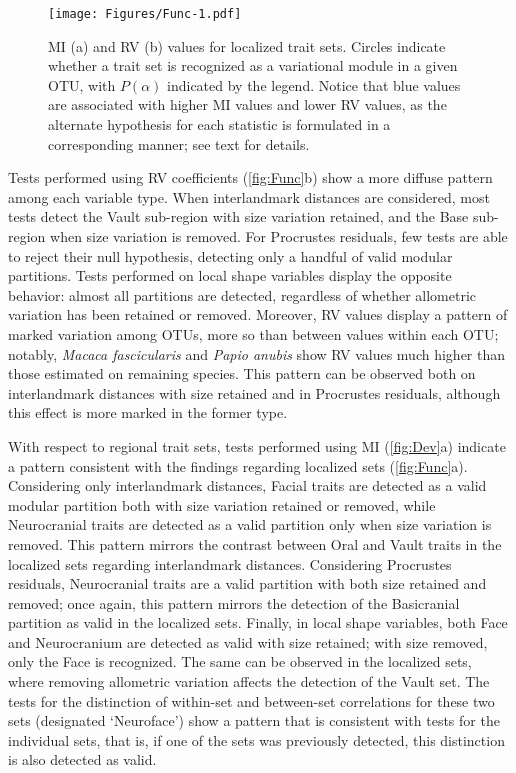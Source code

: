 \documentclass[12pt,]{article}
\begin{document}
\begin{figure}[htbp]
\centering
\texttt{[image: Figures/Func-1.pdf]}
\caption{MI (a) and RV (b) values for localized trait sets. Circles
indicate whether a trait set is recognized as a variational module in a
given OTU, with $P(\alpha)$ indicated by the legend. Notice that blue
values are associated with higher MI values and lower RV values, as the
alternate hypothesis for each statistic is formulated in a corresponding
manner; see text for details. \label{fig:Func}}
\end{figure}

Tests performed using RV coefficients (\autoref{fig:Func}b) show a more
diffuse pattern among each variable type. When interlandmark distances
are considered, most tests detect the Vault sub-region with size
variation retained, and the Base sub-region when size variation is
removed. For Procrustes residuals, few tests are able to reject their
null hypothesis, detecting only a handful of valid modular partitions.
Tests performed on local shape variables display the opposite behavior:
almost all partitions are detected, regardless of whether allometric
variation has been retained or removed. Moreover, RV values display a
pattern of marked variation among OTUs, more so than between values
within each OTU; notably, \emph{Macaca fascicularis} and \emph{Papio
anubis} show RV values much higher than those estimated on remaining
species. This pattern can be observed both on interlandmark distances
with size retained and in Procrustes residuals, although this effect is
more marked in the former type.

With respect to regional trait sets, tests performed using MI
(\autoref{fig:Dev}a) indicate a pattern consistent with the findings
regarding localized sets (\autoref{fig:Func}a). Considering only
interlandmark distances, Facial traits are detected as a valid modular
partition both with size variation retained or removed, while
Neurocranial traits are detected as a valid partition only when size
variation is removed. This pattern mirrors the contrast between Oral and
Vault traits in the localized sets regarding interlandmark distances.
Considering Procrustes residuals, Neurocranial traits are a valid
partition with both size retained and removed; once again, this pattern
mirrors the detection of the Basicranial partition as valid in the
localized sets. Finally, in local shape variables, both Face and
Neurocranium are detected as valid with size retained; with size
removed, only the Face is recognized. The same can be observed in the
localized sets, where removing allometric variation affects the
detection of the Vault set. The tests for the distinction of within-set
and between-set correlations for these two sets (designated `Neuroface')
show a pattern that is consistent with tests for the individual sets,
that is, if one of the sets was previously detected, this distinction is
also detected as valid.
\end{document}
